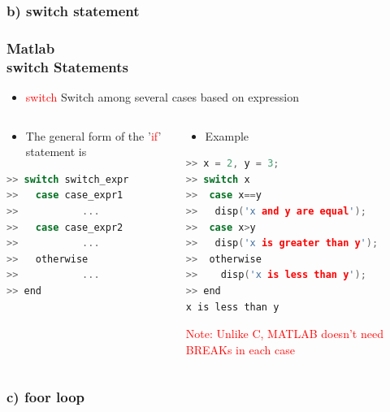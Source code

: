 \documentclass[hyperref={pdfpagelabels=true}]{beamer}
\begin{document}
\subsubsection{b) switch statement}

\begin{frame}[fragile]
\frametitle{Matlab \\ {\small switch Statements}}
 \begin{itemize}
         \item[\ding{60}] \textcolor{red}{switch} Switch among several cases based on expression
         \end{itemize}
\begin{columns}
    \begin{column}{0.49\textwidth}
        \begin{itemize}
         \item[\ding{60}] The general form of the '\textcolor{red}{if}' statement is 
         \end{itemize}
\begin{tcolorbox}
\scriptsize{
\begin{lstlisting}[language=C++,basicstyle=\ttfamily,keywordstyle=\color{red}]
>> switch switch_expr
>>   case case_expr1
>>           ...
>>   case case_expr2
>>           ...
>>   otherwise
>>           ... 
>> end
\end{lstlisting} }
\end{tcolorbox}
      \end{column}
    \begin{column}{0.5\textwidth}
        \begin{itemize}
         \item[\ding{60}] Example 
         \end{itemize}
\tiny{
\begin{lstlisting}[language=C++,basicstyle=\ttfamily,keywordstyle=\color{red}]
>> x = 2, y = 3;
>> switch x
>>  case x==y
>>   disp('x and y are equal');
>>  case x>y
>>   disp('x is greater than y');
>>  otherwise
>>    disp('x is less than y');
>> end
x is less than y
\end{lstlisting}}
\textcolor{red}{Note: Unlike C, MATLAB doesn't need
BREAKs in each case}
    \end{column}
\end{columns}
\end{frame}

\subsubsection{c) foor loop}
\end{document}
